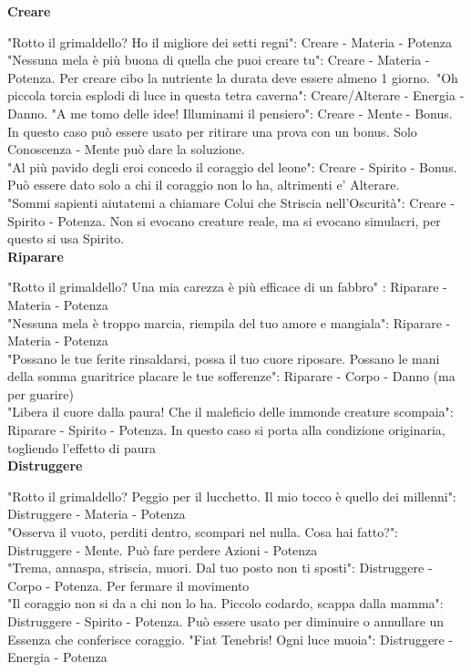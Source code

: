 \documentclass[a4paper,twoside,openany]{book}
\begin{document}
\begin{multicols}{2}
\textbf{Creare}

"Rotto il grimaldello? Ho il migliore dei setti regni": Creare - Materia - Potenza\\
"Nessuna mela è più buona di quella che puoi creare tu": Creare - Materia - Potenza. Per creare cibo la nutriente la durata deve essere almeno 1 giorno.\
"Oh piccola torcia esplodi di luce in questa tetra caverna": Creare/Alterare - Energia - Danno. 
"A me tomo delle idee! Illuminami il pensiero": Creare - Mente - Bonus. In questo caso può essere usato per ritirare una prova con un bonus. Solo Conoscenza - Mente può dare la soluzione.\\
"Al più pavido degli eroi concedo il coraggio del leone": Creare - Spirito - Bonus. Può essere dato solo a chi il coraggio non lo ha, altrimenti e' Alterare.\\
"Sommi sapienti aiutatemi a chiamare Colui che Striscia nell'Oscurità": Creare - Spirito - Potenza. Non si evocano creature reale, ma si evocano simulacri, per questo si usa Spirito.\\

\textbf{Riparare}

"Rotto il grimaldello? Una mia carezza è più efficace di un fabbro" : Riparare - Materia - Potenza\\
"Nessuna mela è troppo marcia, riempila del tuo amore e mangiala": Riparare - Materia - Potenza\\
"Possano le tue ferite rinsaldarsi, possa il tuo cuore riposare. Possano le mani della somma guaritrice placare le tue sofferenze": Riparare - Corpo - Danno (ma per guarire)\\
"Libera il cuore dalla paura! Che il maleficio delle immonde creature scompaia": Riparare - Spirito - Potenza. In questo caso si porta alla condizione originaria, togliendo l'effetto di paura\\

\textbf{Distruggere}

"Rotto il grimaldello? Peggio per il lucchetto. Il mio tocco è quello dei millenni": Distruggere - Materia - Potenza\\
"Osserva il vuoto, perditi dentro, scompari nel nulla. Cosa hai fatto?": Distruggere - Mente. Può fare perdere Azioni - Potenza\\
"Trema, annaspa, striscia, muori. Dal tuo posto non ti sposti": Distruggere - Corpo - Potenza. Per fermare il movimento\\
"Il coraggio non si da a chi non lo ha. Piccolo codardo, scappa dalla mamma": Distruggere - Spirito - Potenza. Può essere usato per diminuire o annullare un Essenza che conferisce coraggio.
"Fiat Tenebris! Ogni luce muoia": Distruggere - Energia - Potenza\\


\end{multicols}
\end{document}
